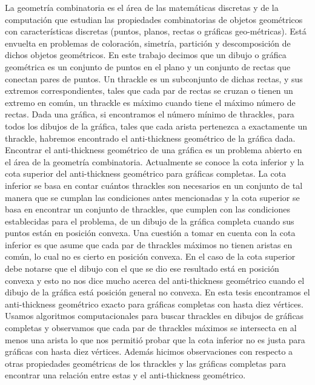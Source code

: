 La geometría combinatoria es el área de las matemáticas discretas y de la computación que estudian las
propiedades combinatorias de objetos geométricos con características discretas (puntos, planos, rectas o
gráficas geo\hyp métricas). Está envuelta en problemas de coloración, simetría, partición y descomposición
de dichos objetos geométricos. En este trabajo decimos que un dibujo o gráfica geométrica es un conjunto de
puntos en el plano y un conjunto de rectas que conectan pares de puntos. Un thrackle es un subconjunto de
dichas rectas, y sus extremos correspondientes, tales que cada par de rectas se cruzan o tienen un extremo en común, un thrackle es máximo cuando tiene el máximo número de rectas. Dada una gráfica, si encontramos el número mínimo de thrackles, para todos los dibujos de la gráfica, tales que cada arista pertenezca a exactamente un thrackle, habremos encontrado el anti-thickness geométrico de la gráfica dada. Encontrar el
anti-thickness geométrico de una gráfica es un problema abierto en el área de la geometría combinatoria.
Actualmente se conoce la cota inferior y la cota superior del anti-thickness
geométrico para gráficas completas. La cota inferior se basa en contar cuántos thrackles son
necesarios en un conjunto de tal manera que se cumplan las condiciones antes mencionadas y la cota superior se basa en encontrar un conjunto de thrackles, que cumplen con las condiciones establecidas para el problema, de un dibujo de la gráfica completa cuando sus puntos están en posición convexa. Una cuestión a tomar en cuenta con la cota inferior es que asume que cada par de thrackles máximos no tienen aristas en común, lo cual no es cierto en posición convexa. En el caso de la cota superior debe notarse que el dibujo con el que se dio ese resultado está en posición convexa y esto no nos dice mucho acerca del anti-thickness geométrico cuando el dibujo de la gráfica está posición general no convexa. En esta tesis encontramos el
anti-thickness geométrico exacto para gráficas completas con hasta diez vértices. Usamos algoritmos
computacionales para buscar thrackles en dibujos de gráficas completas y observamos que cada par de
thrackles máximos se intersecta en al menos una arista lo que nos permitió probar que la cota inferior no
es justa para gráficas con hasta diez vértices. Además hicimos observaciones con respecto a otras
propiedades geométricas de los thrackles y las gráficas completas para encontrar una relación entre estas y
el anti-thickness geométrico.

